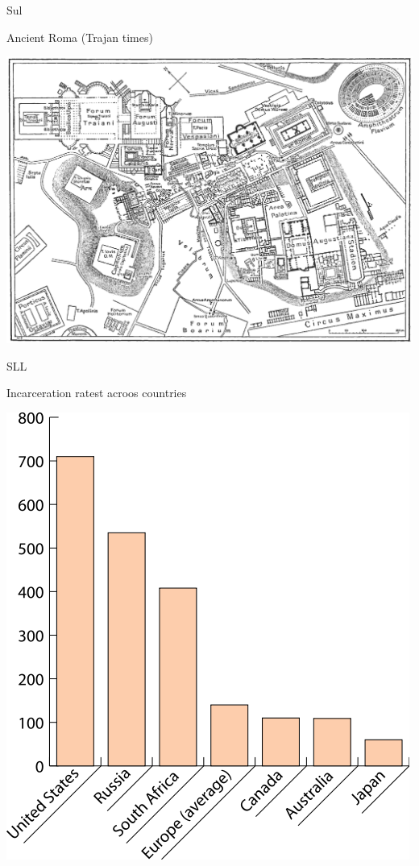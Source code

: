 \documentclass[print,Draft]{faosyb}
\begin{document}
\begin{map}{S}{ul}
\caption{Ancient Roma \newline (Trajan times)}
\label{map:roma}
\includegraphics[width=\chartwidth,height=\chartheight]{Rome}
\end{map}
\lipsum
\begin{chart}{S}{LL}
\caption{Incarceration ratest acroos countries}
\label{chart:incarceration}
\includegraphics[width=\chartwidth,height=\chartheight]{incarceration}  
\end{chart}
\end{document}
